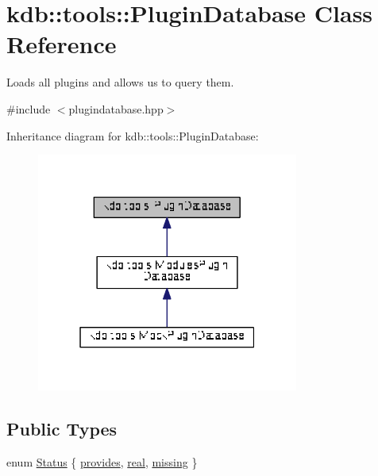 \hypertarget{classkdb_1_1tools_1_1PluginDatabase}{\section{kdb\+:\+:tools\+:\+:Plugin\+Database Class Reference}
\label{classkdb_1_1tools_1_1PluginDatabase}
}


Loads all plugins and allows us to query them.  




{\ttfamily \#include $<$plugindatabase.\+hpp$>$}



Inheritance diagram for kdb\+:\+:tools\+:\+:Plugin\+Database\+:
\nopagebreak
\begin{figure}[H]
\begin{center}
\leavevmode
\includegraphics[width=244pt]{classkdb_1_1tools_1_1PluginDatabase__inherit__graph}
\end{center}
\end{figure}
\subsection*{Public Types}
\begin{DoxyCompactItemize}
\item 
enum \hyperlink{classkdb_1_1tools_1_1PluginDatabase_afc91ff760616ee83c6afb70e5a2f0601}{Status} \{ \hyperlink{classkdb_1_1tools_1_1PluginDatabase_afc91ff760616ee83c6afb70e5a2f0601a73ff10d6a07213c277db4326b3df6c4b}{provides}, 
\hyperlink{classkdb_1_1tools_1_1PluginDatabase_afc91ff760616ee83c6afb70e5a2f0601a2b7279a50ed80231a60b0435340c31a8}{real}, 
\hyperlink{classkdb_1_1tools_1_1PluginDatabase_afc91ff760616ee83c6afb70e5a2f0601ae789aaff1847ebb77eecb027c5ee0401}{missing}
 \}
\end{DoxyCompactItemize}
